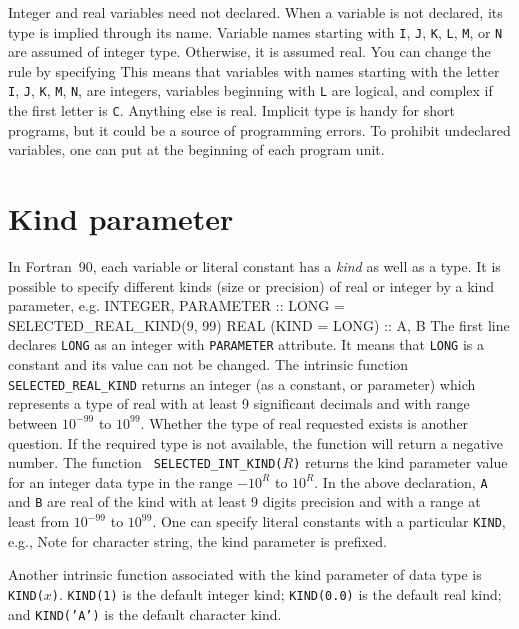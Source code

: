 {Integer and real variables need not declared.  When a variable is not
declared, its type is implied through its name.  Variable names
starting with {\tt I}, {\tt J}, {\tt K}, {\tt L}, {\tt M}, or {\tt N}
are assumed of integer type.  Otherwise, it is assumed real. You can
change the rule by specifying 
\sms
{}
\sms
This means that variables with names starting with the letter {\tt I}, 
{\tt J}, {\tt K}, {\tt M}, {\tt N}, are integers,  variables
beginning with {\tt L} are logical, and complex if the first letter
is {\tt C}.  Anything else is real. 
Implicit type is handy for short programs, but it could be a source
of programming errors. To prohibit undeclared variables, one can put
\sms
{}
\sms
at the beginning of each program unit.

\section{Kind parameter}
In Fortran~90, each variable or literal constant has a {\sl kind} 
as well as a type. 
It is possible to specify different kinds (size or precision) of real
or integer by a kind parameter, e.g.
\ttbg
INTEGER, PARAMETER :: LONG = SELECTED_REAL_KIND(9, 99)
REAL (KIND = LONG) :: A, B
\tted
The first line declares {\tt LONG} as an integer with {\tt PARAMETER}
attribute.  It means that {\tt LONG} is a constant and its value can
not be changed. 
The intrinsic function {\tt SELECTED\_REAL\_KIND} returns an integer (as
a constant, or parameter) which represents a type of real with
at least 9 significant decimals and
with range between $10^{-99}$ to $10^{99}$.  Whether the type of real
requested exists is another question.  If the required type is not available,
the function will return a negative number.  The function {\tt
SELECTED\_INT\_KIND($R$)} returns the kind parameter value for an
integer data type in the range $-10^R$ to $10^R$.    In the above
declaration, {\tt A} and {\tt B} are real of the kind with at least 9
digits precision and with a range at least from $10^{-99}$ to 
$10^{99}$.  One can specify
literal constants with a particular {\tt KIND}, e.g.,
\sms
{}
\sms
Note for character string, the kind parameter is prefixed. 

Another intrinsic function associated with the kind parameter of data
type is {\tt KIND($x$)}.  {\tt KIND(1)} is the default integer kind;
{\tt KIND(0.0)} is the default real kind; and {\tt KIND('A')} is the
default character kind.

}
